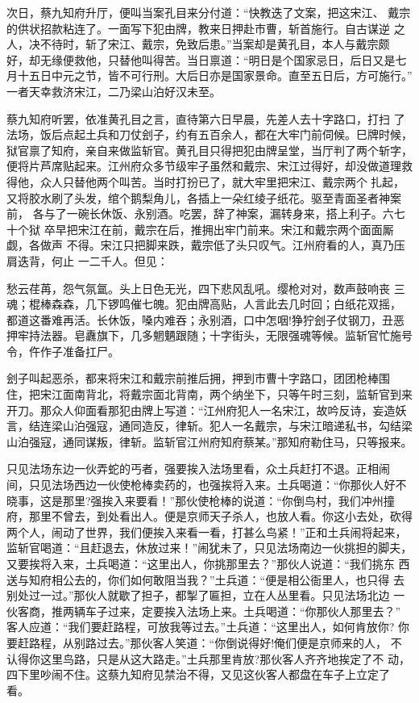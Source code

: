 次日，蔡九知府升厅，便叫当案孔目来分付道：“快教迭了文案，把这宋江、
戴宗的供状招款粘连了。一面写下犯由牌，教来日押赴市曹，斩首施行。自古谋逆
之人，决不待时，斩了宋江、戴宗，免致后患。”当案却是黄孔目，本人与戴宗颇
好，却无缘便救他，只替他叫得苦。当日禀道：“明日是个国家忌日，后日又是七
月十五日中元之节，皆不可行刑。大后日亦是国家景命。直至五日后，方可施行。”
一者天幸救济宋江，二乃梁山泊好汉未至。

蔡九知府听罢，依准黄孔目之言，直待第六日早晨，先差人去十字路口，打扫
了法场，饭后点起土兵和刀仗刽子，约有五百余人，都在大牢门前伺候。巳牌时候，
狱官禀了知府，亲自来做监斩官。黄孔目只得把犯由牌呈堂，当厅判了两个斩字，
便将片芦席贴起来。江州府众多节级牢子虽然和戴宗、宋江过得好，却没做道理救
得他，众人只替他两个叫苦。当时打扮已了，就大牢里把宋江、戴宗两个扎起，
又将胶水刷了头发，绾个鹅梨角儿，各插上一朵红绫子纸花。驱至青面圣者神案前，
各与了一碗长休饭、永别酒。吃罢，辞了神案，漏转身来，搭上利子。六七十个狱
卒早把宋江在前，戴宗在后，推拥出牢门前来。宋江和戴宗两个面面厮觑，各做声
不得。宋江只把脚来跌，戴宗低了头只叹气。江州府看的人，真乃压肩迭背，何止
一二千人。但见：

愁云荏苒，怨气氛氲。头上日色无光，四下悲风乱吼。缨枪对对，数声鼓响丧
三魂；棍棒森森，几下锣鸣催七魄。犯由牌高贴，人言此去几时回；白纸花双摇，
都道这番难再活。长休饭，嗓内难吞；永别酒，口中怎咽!狰狞刽子仗钢刀，丑恶
押牢持法器。皂纛旗下，几多魍魉跟随；十字街头，无限强魂等候。监斩官忙施号
令，仵作子准备扛尸。

刽子叫起恶杀，都来将宋江和戴宗前推后拥，押到市曹十字路口，团团枪棒围
住，把宋江面南背北，将戴宗面北背南，两个纳坐下，只等午时三刻，监斩官到来
开刀。那众人仰面看那犯由牌上写道：“江州府犯人一名宋江，故吟反诗，妄造妖
言，结连梁山泊强寇，通同造反，律斩。犯人一名戴宗，与宋江暗递私书，勾结梁
山泊强寇，通同谋叛，律斩。监斩官江州府知府蔡某。”那知府勒住马，只等报来。

只见法场东边一伙弄蛇的丐者，强要挨入法场里看，众土兵赶打不退。正相闹
间，只见法场西边一伙使枪棒卖药的，也强挨将入来。土兵喝道：“你那伙人好不
晓事，这是那里?强挨入来要看！”那伙使枪棒的说道：“你倒鸟村，我们冲州撞
府，那里不曾去，到处看出人。便是京师天子杀人，也放人看。你这小去处，砍得
两个人，闹动了世界，我们便挨入来看一看，打甚么鸟紧！”正和土兵闹将起来，
监斩官喝道：“且赶退去，休放过来！”闹犹未了，只见法场南边一伙挑担的脚夫，
又要挨将入来，土兵喝道：“这里出人，你挑那里去？”那伙人说道：“我们挑东
西送与知府相公去的，你们如何敢阻当我？”土兵道：“便是相公衙里人，也只得
去别处过一过。”那伙人就歇了担子，都掣了匾担，立在人丛里看。只见法场北边
一伙客商，推两辆车子过来，定要挨入法场上来。土兵喝道：“你那伙人那里去？”
客人应道：“我们要赶路程，可放我等过去。”土兵道：“这里出人，如何肯放你?
你要赶路程，从别路过去。”那伙客人笑道：“你倒说得好!俺们便是京师来的人，
不认得你这里鸟路，只是从这大路走。”土兵那里肯放?那伙客人齐齐地挨定了不
动，四下里吵闹不住。这蔡九知府见禁治不得，又见这伙客人都盘在车子上立定了
看。

